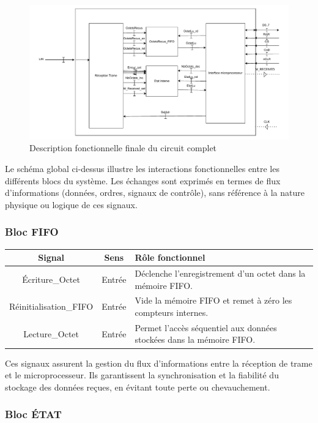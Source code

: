\begin{figure}[H]
    \centering
    \includegraphics[width=0.8\linewidth]{images/inter/Schema_Final.pdf}
    \caption{Description fonctionnelle finale du circuit complet}
    \label{fig:schema_final}
\end{figure}

Le schéma global ci-dessus illustre les interactions fonctionnelles entre les différents blocs du système. Les échanges sont exprimés en termes de flux d’informations (données, ordres, signaux de contrôle), sans référence à la nature physique ou logique de ces signaux.

\subsubsection*{Bloc FIFO}

\begin{center}
\renewcommand{\arraystretch}{1.2}
\small
\begin{tabularx}{\textwidth}{|c||c|X|}
    \hline
    \textbf{Signal} & \textbf{Sens} & \textbf{Rôle fonctionnel} \\ \hline
    Écriture\_Octet & Entrée & Déclenche l’enregistrement d’un octet dans la mémoire FIFO. \\ \hline
    Réinitialisation\_FIFO & Entrée & Vide la mémoire FIFO et remet à zéro les compteurs internes. \\ \hline
    Lecture\_Octet & Entrée & Permet l’accès séquentiel aux données stockées dans la mémoire FIFO. \\ \hline
\end{tabularx}
\end{center}

Ces signaux assurent la gestion du flux d’informations entre la réception de trame et le microprocesseur.  
Ils garantissent la synchronisation et la fiabilité du stockage des données reçues, en évitant toute perte ou chevauchement.

\subsubsection*{Bloc ÉTAT}

